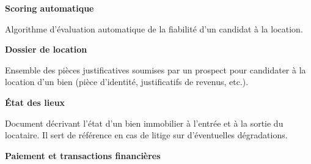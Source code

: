 \documentclass[12pt,a4paper]{report}
\begin{document}
\vspace{0.6cm}

\begin{infobox}
\textbf{Scoring automatique}

Algorithme d'évaluation automatique de la fiabilité d'un candidat à la location.
\end{infobox}

\vspace{0.6cm}

\begin{infobox}
\textbf{Dossier de location}

Ensemble des pièces justificatives soumises par un prospect pour candidater à la location d'un bien (pièce d'identité, justificatifs de revenus, etc.).
\end{infobox}




\vspace{0.6cm}

\begin{infobox}
\textbf{État des lieux}

Document décrivant l'état d'un bien immobilier à l'entrée et à la sortie du locataire. Il sert de référence en cas de litige sur d'éventuelles dégradations.
\end{infobox}




\newpage

{\Large\textcolor{marine}{\textbf{Paiement et transactions financières}}}
\end{document}
